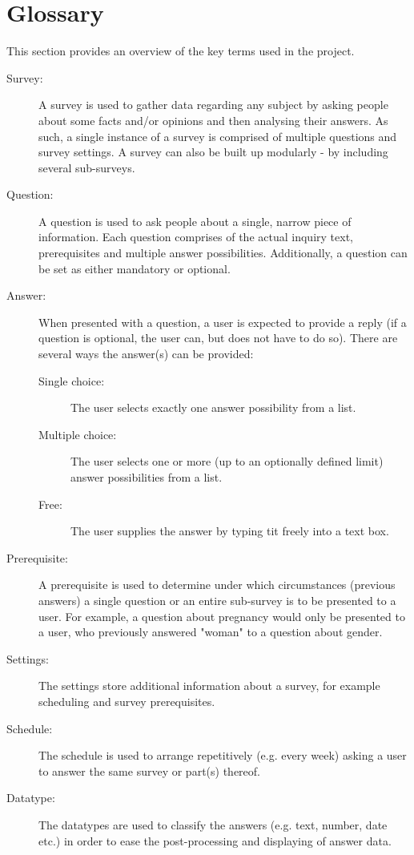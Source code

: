 \chapter{Glossary}
\label{chap:glossary}

This section provides an overview of the key terms used in the project.
\begin{description}
\item[Survey:] A survey is used to gather data regarding any subject by asking people about some facts and/or opinions and then analysing their answers. As such, a single instance of a survey is comprised of multiple questions and survey settings. A survey can also be built up modularly - by including several sub-surveys.
\item[Question:] A question is used to ask people about a single, narrow piece of information. Each question comprises of the actual inquiry text, prerequisites and multiple answer possibilities. Additionally, a question can be set as either mandatory or optional.
\item[Answer:] When presented with a question, a user is expected to provide a reply (if a question is optional, the user can, but does not have to do so). There are several ways the answer(s) can be provided:
  \begin{description}
    \item[Single choice:] The user selects exactly one answer possibility from a list.
    \item[Multiple choice:] The user selects one or more (up to an optionally defined limit) answer possibilities from a list.
    \item[Free:] The user supplies the answer by typing tit freely into a text box.
  \end{description}
\item[Prerequisite:] A prerequisite is used to determine under which circumstances (previous answers) a single question or an entire sub-survey is to be presented to a user. For example, a question about pregnancy would only be presented to a user, who previously answered "woman" to a question about gender.
\item[Settings:] The settings store additional information about a survey, for example scheduling and survey prerequisites.
\item[Schedule:] The schedule is used to arrange repetitively (e.g. every week) asking a user to answer the same survey or part(s) thereof.
\item[Datatype:] The datatypes are used to classify the answers (e.g. text, number, date etc.) in order to ease the post-processing and displaying of answer data.
\end{description}